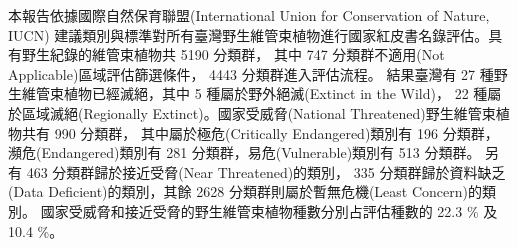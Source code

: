 
\noindent 本報告依據國際自然保育聯盟(International Union for Conservation of Nature, IUCN)
建議類別與標準對所有臺灣野生維管束植物進行國家紅皮書名錄評估。具有野生紀錄的維管束植物共 5190 分類群，
其中 747 分類群不適用(Not Applicable)區域評估篩選條件， 4443 分類群進入評估流程。
結果臺灣有 27 種野生維管束植物已經滅絕，其中 5 種屬於野外絕滅(Extinct in the Wild)，
22 種屬於區域滅絕(Regionally Extinct)。國家受威脅(National Threatened)野生維管束植物共有 990 分類群，
其中屬於極危(Critically Endangered)類別有 196 分類群，
瀕危(Endangered)類別有 281 分類群，易危(Vulnerable)類別有 513 分類群。
另有 463 分類群歸於接近受脅(Near Threatened)的類別，
335 分類群歸於資料缺乏(Data Deficient)的類別，其餘 2628 分類群則屬於暫無危機(Least Concern)的類別。
國家受威脅和接近受脅的野生維管束植物種數分別占評估種數的 22.3 \% 及 10.4 \%。 
